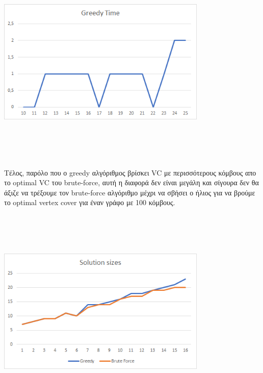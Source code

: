 \documentclass{article}
\begin{document}
\begin{center}
\includegraphics[width=10cm,height=10cm,keepaspectratio]{greedytime}\\
\end{center}
Τέλος, παρόλο που ο greedy αλγόριθμος βρίσκει VC με περισσότερους κόμβους απο το optimal VC του brute-force, αυτή η διαφορά δεν είναι μεγάλη και σίγουρα
δεν θα άξιζε να τρέξουμε τον brute-force αλγόριθμο μέχρι να σβήσει ο ήλιος για να βρούμε το optimal vertex cover για έναν γράφο με 100 κόμβους.  
\begin{center}
\includegraphics[width=10cm,height=10cm,keepaspectratio]{solutionsizes}\\
\end{center}
\end{document}
